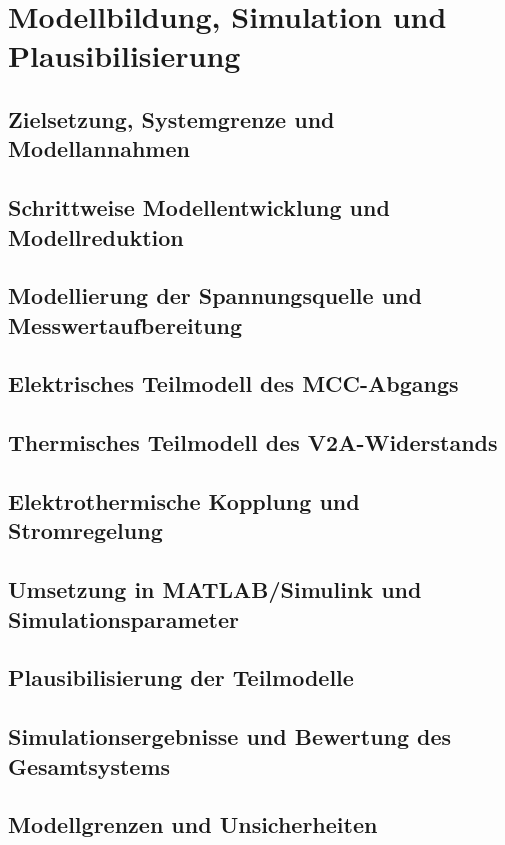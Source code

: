 \section{Modellbildung, Simulation und Plausibilisierung}
\label{chap:modellbildung_simulation}

\subsection{Zielsetzung, Systemgrenze und Modellannahmen}
\label{sec:zielsetzung_systemgrenze_modellannahmen}

\subsection{Schrittweise Modellentwicklung und Modellreduktion}
\label{sec:modellentwicklung_modellreduktion}

\subsection{Modellierung der Spannungsquelle und Messwertaufbereitung}
\label{sec:spannungsquelle_messwertaufbereitung}

\subsection{Elektrisches Teilmodell des MCC-Abgangs}
\label{sec:elektrisches_teilmodell}

\subsection{Thermisches Teilmodell des V2A-Widerstands}
\label{sec:thermisches_teilmodell}

\subsection{Elektrothermische Kopplung und Stromregelung}
\label{sec:elektrothermische_kopplung}

\subsection{Umsetzung in MATLAB/Simulink und Simulationsparameter}
\label{sec:umsetzung_simulationsparameter}

\subsection{Plausibilisierung der Teilmodelle}
\label{sec:plausibilisierung_teilmodelle}

\subsection{Simulationsergebnisse und Bewertung des Gesamtsystems}
\label{sec:simulationsergebnisse_bewertung}

\subsection{Modellgrenzen und Unsicherheiten}
\label{sec:modellgrenzen_unsicherheiten}